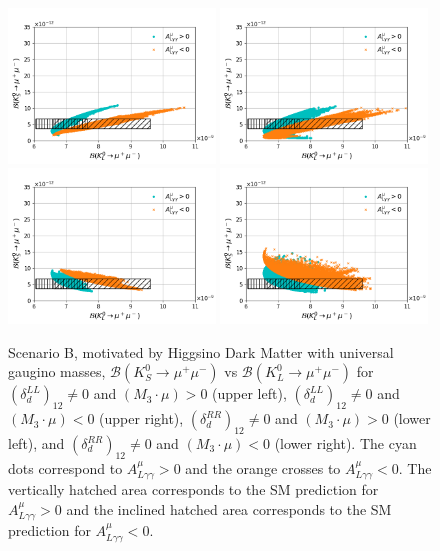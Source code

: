 \begin{figure}[h!]
\centering
\includegraphics[width=0.49\textwidth]{figs/figure_1_SCB_LL_pos.png}
\includegraphics[width=0.49\textwidth]{figs/figure_1_SCB_LL_neg.png}\\
\includegraphics[width=0.49\textwidth]{figs/figure_1_SCB_RR_pos.png}
\includegraphics[width=0.49\textwidth]{figs/figure_1_SCB_RR_neg.png}
\caption{\label{fig:BR_SCB} Scenario B, motivated by Higgsino Dark Matter with universal gaugino masses, $\mathcal{B}(K_S^0\rightarrow\mu^+\mu^-)$ vs $\mathcal{B}(K_L^0\rightarrow\mu^+\mu^-)$ for $\left( \delta_{d}^{LL} \right)_{12}\neq 0$ and $(M_3\cdot\mu)>0$ (upper left), $\left(\delta_{d}^{LL}\right)_{12}\neq 0$ and $(M_3\cdot\mu)<0$ (upper right), $\left(\delta_{d}^{RR}\right)_{12}\neq 0$ and $(M_3\cdot\mu)>0$ (lower left), and $\left( \delta_{d}^{RR} \right)_{12}\neq 0$ and $(M_3\cdot\mu)<0$ (lower right). The cyan dots correspond to $A^\mu_{L\gamma \gamma} > 0$ and the orange crosses to $A^\mu_{L\gamma \gamma} < 0$. The vertically hatched area corresponds to the SM prediction for $A^\mu_{L\gamma \gamma} > 0$ and the inclined hatched area corresponds to the SM prediction for $A^\mu_{L\gamma \gamma} < 0$.}
\end{figure}

